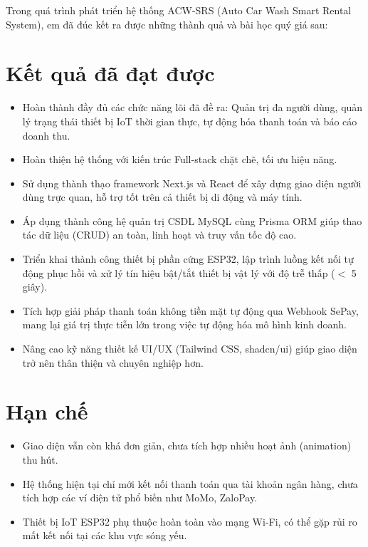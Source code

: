 \documentclass[../main.tex]{subfiles}
\begin{document}
Trong quá trình phát triển hệ thống ACW-SRS (Auto Car Wash Smart Rental System), em đã đúc kết ra được những thành quả và bài học quý giá sau:

\section*{Kết quả đã đạt được}
\begin{itemize}
    \item Hoàn thành đầy đủ các chức năng lõi đã đề ra: Quản trị đa người dùng, quản lý trạng thái thiết bị IoT thời gian thực, tự động hóa thanh toán và báo cáo doanh thu.
    \item Hoàn thiện hệ thống với kiến trúc Full-stack chặt chẽ, tối ưu hiệu năng.
    \item Sử dụng thành thạo framework Next.js và React để xây dựng giao diện người dùng trực quan, hỗ trợ tốt trên cả thiết bị di động và máy tính.
    \item Áp dụng thành công hệ quản trị CSDL MySQL cùng Prisma ORM giúp thao tác dữ liệu (CRUD) an toàn, linh hoạt và truy vấn tốc độ cao.
    \item Triển khai thành công thiết bị phần cứng ESP32, lập trình luồng kết nối tự động phục hồi và xử lý tín hiệu bật/tắt thiết bị vật lý với độ trễ thấp ($<$ 5 giây).
    \item Tích hợp giải pháp thanh toán không tiền mặt tự động qua Webhook SePay, mang lại giá trị thực tiễn lớn trong việc tự động hóa mô hình kinh doanh.
    \item Nâng cao kỹ năng thiết kế UI/UX (Tailwind CSS, shadcn/ui) giúp giao diện trở nên thân thiện và chuyên nghiệp hơn.
\end{itemize}

\section*{Hạn chế}
\begin{itemize}
    \item Giao diện vẫn còn khá đơn giản, chưa tích hợp nhiều hoạt ảnh (animation) thu hút.
    \item Hệ thống hiện tại chỉ mới kết nối thanh toán qua tài khoản ngân hàng, chưa tích hợp các ví điện tử phổ biến như MoMo, ZaloPay.
    \item Thiết bị IoT ESP32 phụ thuộc hoàn toàn vào mạng Wi-Fi, có thể gặp rủi ro mất kết nối tại các khu vực sóng yếu.
\end{itemize}
\end{document}
